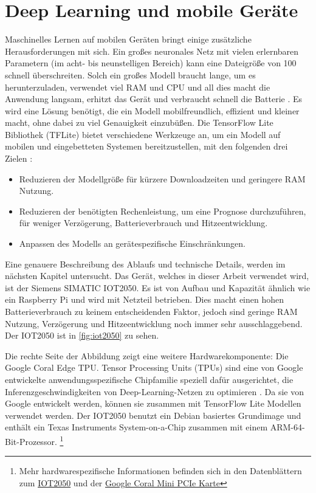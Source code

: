 \section{Deep Learning und mobile Geräte}
Maschinelles Lernen auf mobilen Geräten bringt einige
zusätzliche Herausforderungen mit sich.
Ein großes neuronales Netz mit vielen erlernbaren
Parametern (im acht- bis neunstelligen Bereich) kann eine Dateigröße von
\qty{100}{\mega\byte} schnell überschreiten.
Solch ein großes Modell braucht lange, um es herunterzuladen,
verwendet viel RAM und CPU und all dies macht die Anwendung langsam,
erhitzt das Gerät und verbraucht schnell die Batterie \parencite[685]{book:hands-on-ml}.
Es wird eine Lösung benötigt, die ein Modell mobilfreundlich,
effizient und kleiner macht, ohne dabei zu viel Genauigkeit einzubüßen.
Die TensorFlow Lite Bibliothek (TFLite)
bietet verschiedene Werkzeuge an, um ein Modell auf mobilen und eingebetteten
Systemen bereitzustellen, mit den folgenden drei Zielen \parencite[685]{book:hands-on-ml}:
\begin{itemize}
  \item Reduzieren der Modellgröße für kürzere Downloadzeiten und
        geringere RAM Nutzung.
  \item Reduzieren der benötigten Rechenleistung, um eine Prognose durchzuführen,
        für weniger Verzögerung, Batterieverbrauch und Hitzeentwicklung.
  \item Anpassen des Modells an gerätespezifische Einschränkungen.
\end{itemize}
Eine genauere Beschreibung des Ablaufs und technische Details, werden
im nächsten Kapitel untersucht.
Das Gerät, welches in dieser Arbeit verwendet wird, ist der Siemens SIMATIC
IOT2050. Es ist von Aufbau und Kapazität ähnlich wie ein Raspberry Pi
und wird mit Netzteil betrieben.
Dies macht einen hohen Batterieverbrauch zu keinem entscheidenden Faktor,
jedoch sind geringe RAM Nutzung, Verzögerung und Hitzeentwicklung
noch immer sehr ausschlaggebend.
Der IOT2050 ist in \autoref{fig:iot2050} zu sehen.
\newpage

\noindent
Die rechte Seite der Abbildung zeigt eine weitere Hardwarekomponente:
Die Google Coral Edge TPU. Tensor Processing Units (TPUs)
sind eine von Google entwickelte anwendungsspezifische Chipfamilie
speziell dafür ausgerichtet, die Inferenzgeschwindigkeiten
von Deep-Learning-Netzen zu optimieren \parencite{online:edge-tpu}.
Da sie von Google entwickelt werden, können sie zusammen
mit TensorFlow Lite Modellen verwendet werden. Der IOT2050 benutzt
ein Debian basiertes Grundimage und enthält ein
Texas Instruments System-on-a-Chip zusammen mit einem ARM-64-Bit-Prozessor.
\footnote{Mehr hardwarespezifische Informationen befinden sich in den Datenblättern zum
  \href{https://support.industry.siemens.com/cs/document/109779016/simatic-iot2050}{IOT2050}
  und der \href{https://coral.ai/docs/mini-pcie/datasheet/}{Google Coral Mini PCIe Karte}}